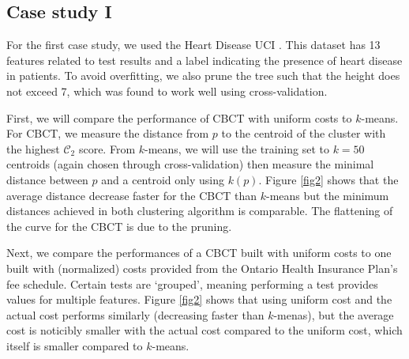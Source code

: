 \documentclass[conference]{IEEEtran}
\begin{document}
\subsection{Case study I}
For the first case study, we used the Heart Disease UCI . This dataset has
13 features related to test results and a label indicating the presence of heart
disease in patients.  To avoid overfitting, we also prune the tree such that
the height does not exceed 7, which was found to work well using 
cross-validation. 

First, we will compare the performance of CBCT with uniform costs to $k$-means.
For CBCT, we measure the distance from $p$ to the centroid of the
cluster with the highest $\mathcal{C}_2$ score. From $k$-means, we will use
the training set to $k=50$ centroids (again chosen through cross-validation)
then measure the minimal distance between $p$ and a centroid only
using $k(p)$. Figure \ref{fig2} shows that the average distance decrease
faster for the CBCT than $k$-means but the minimum distances achieved
in both clustering algorithm is comparable. The flattening of the curve
for the CBCT is due to the pruning.

Next, we compare the performances of a CBCT built with uniform costs to
one built with (normalized) costs provided from the Ontario Health 
Insurance Plan's
fee schedule. Certain tests are `grouped', meaning performing a test provides
values for multiple features. Figure \ref{fig2} shows that using uniform
cost and the actual cost performs similarly (decreasing faster than
$k$-menas), but the average cost is noticibly smaller with the actual cost
compared to the uniform cost, which itself is smaller compared to $k$-means.
\end{document}
